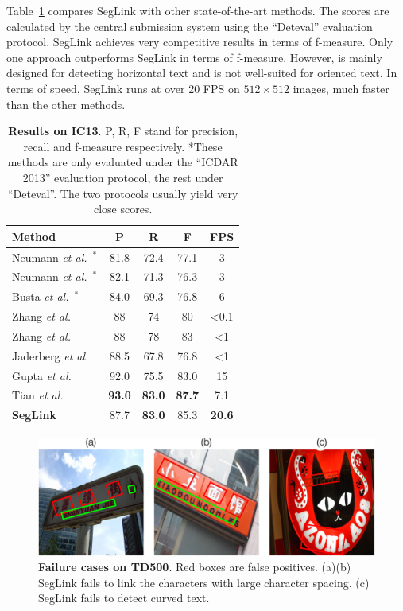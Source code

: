 \documentclass[10pt,twocolumn,letterpaper]{article}
\begin{document}
Table~\ref{tbl:ic13-results} compares SegLink with other state-of-the-art methods.
The scores are calculated by the central submission system using the ``Deteval'' evaluation protocol.
SegLink achieves very competitive results in terms of f-measure.
Only one approach \cite{eccv/TianHHH016} outperforms SegLink in terms of f-measure.
However, \cite{eccv/TianHHH016} is mainly designed for detecting horizontal text and is not well-suited for oriented text.
In terms of speed, SegLink runs at over 20 FPS on $512\times 512$ images, much faster than the other methods.

\begin{table}[hbt] %
  \caption{\textbf{Results on IC13}. P, R, F stand for precision, recall and f-measure respectively. *These methods are only evaluated under the ``ICDAR 2013'' evaluation protocol, the rest under ``Deteval''. The two protocols usually yield very close scores.}
  \vspace{0.5em}
  \centering
  \small
  \label{tbl:ic13-results}
  \begin{tabular}{|l|c|c|c|c|}
  \hline
  \textbf{Method} & \textbf{P} & \textbf{R} & \textbf{F} & \textbf{FPS}\tabularnewline
  \hline
  \hline
  Neumann \emph{et al.}~\cite{icdar/NeumannM15}$^{*}$ & 81.8 & 72.4 & 77.1 & 3\tabularnewline
  \hline
  Neumann \emph{et al.}~\cite{pami/NeumannM16}$^{*}$ & 82.1 & 71.3 & 76.3 & 3\tabularnewline
  \hline
  Busta \emph{et al.}~\cite{iccv/BustaNM15}$^{*}$ & 84.0 & 69.3 & 76.8 & 6\tabularnewline
  \hline
  Zhang \emph{et al.}~\cite{cvpr/ZhangSYB15} & 88 & 74 & 80 & \textless{}0.1\tabularnewline
  \hline
  Zhang \emph{et al.}~\cite{cvpr/ZhangZSYLB16} & 88 & 78 & 83 & \textless{}1\tabularnewline
  \hline
  Jaderberg \emph{et al.}~\cite{ijcv/JaderbergSVZ16} & 88.5 & 67.8 & 76.8 & \textless{}1\tabularnewline
  \hline
  Gupta \emph{et al.}~\cite{cvpr/GuptaVZ16} & 92.0 & 75.5 & 83.0 & 15\tabularnewline
  \hline
  Tian \emph{et al.}~\cite{eccv/TianHHH016} & \textbf{93.0} & \textbf{83.0} & \textbf{87.7} & 7.1\tabularnewline
  \hline
  \textbf{SegLink} & 87.7 & \textbf{83.0} & 85.3 & \textbf{20.6}\tabularnewline
  \hline
  \end{tabular}
\end{table}

\begin{figure}[h]
  \centering
  \includegraphics[width=\linewidth]{figures/fail-cases.pdf}
  \caption{\textbf{Failure cases on TD500}. Red boxes are false positives. (a)(b) SegLink fails to link the characters with large character spacing. (c) SegLink fails to detect curved text.}
  \label{fig:fail-cases}
\end{figure}
\end{document}
